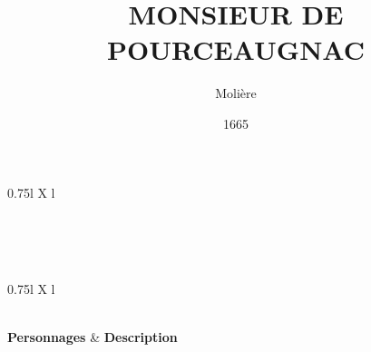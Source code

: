 \documentclass{article}
\title{MONSIEUR DE POURCEAUGNAC}
\author{Molière}
\date{1665}
\begin{document}
\begin{xltabular}{0.75\linewidth}{l X l}
  \caption*{\textbf{Apparatus fontium}}\\
  \hline
  \\
  \hline
  \\
  \hline
\end{xltabular}

\begin{xltabular}{0.75\linewidth}{l X l}
  \caption*{\textbf{Cast List}\label{tab:cast-list}}\\
  \hline
  \textbf{Personnages} & \textbf{Description}\\
  \hline
  \CastTableBody
  \hline
\end{xltabular}


\newpage

\begin{ekddrama}



\end{ekddrama}
\end{document}

